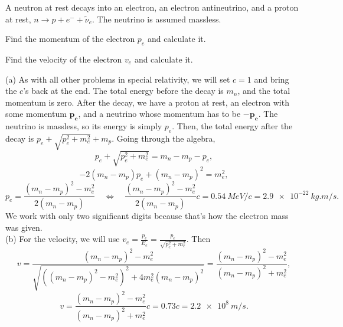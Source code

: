 \documentclass[../TST.tex]{subfiles}
\begin{document}
\begin{pproblem}
A neutron at rest decays into an electron, an electron antineutrino, and a proton at rest, $n\rightarrow p+ e^{-}+\tilde{\nu}_e$. The neutrino is assumed massless.
\begin{subpart}
	\item Find the momentum of the electron $p_e$ and calculate it.
	\item Find the velocity of the electron $v_e$ and calculate it. 
\end{subpart}
\end{pproblem}

\ifprob \else
	\begin{solution} (a) As with all other problems in special relativity, we will set $c=1$ and bring the $c$'s back at the end. The total energy before the decay is $m_n$, and the total momentum is zero. After the decay, we have a proton at rest, an electron with some momentum $\mathbf{p_e}$, and a neutrino whose momentum has to be $-\mathbf{p_e}$. The neutrino is massless, so its energy is simply $p_e$. Then, the total energy after the decay is $p_e+\sqrt{p_e^2+m_e^2}+m_p$. Going through the algebra,
\begin{equation*}
	p_e+\sqrt{p_e^2+m_e^2}=m_n-m_p-p_e,
\end{equation*}
\begin{equation*}
	-2(m_n-m_p)p_e+(m_n-m_p)^2=m_e^2,
\end{equation*}
\begin{equation*}
	p_e=\frac{(m_n-m_p)^2-m_e^2}{2(m_n-m_p)} \quad\Leftrightarrow\quad \boxed{\frac{(m_n-m_p)^2-m_e^2}{2(m_n-m_p)}c=\qty{0.54}{MeV/c} =\qty{2.9e-22}{kg.m/s}.}
\end{equation*}
We work with only two significant digits because that's how the electron mass was given.\\
	
(b) For the velocity, we will use $v_e=\frac{p_e}{E_e}=\frac{p_e}{\sqrt{p_e^2+m_e^2}}$. Then
\begin{equation*}
	v=\frac{(m_n-m_p)^2-m_e^2}{\sqrt{((m_n-m_p)^2-m_e^2)^2+4m_e^2(m_n-m_p)^2}}= \frac{(m_n-m_p)^2-m_e^2}{(m_n-m_p)^2+m_e^2},
\end{equation*}
\begin{equation*}
	\boxed{v=\frac{(m_n-m_p)^2-m_e^2}{(m_n-m_p)^2+m_e^2}c=0.73c=\qty{2.2e8}{m/s}.}
\end{equation*}
\end{solution}
\fi
\end{document}
